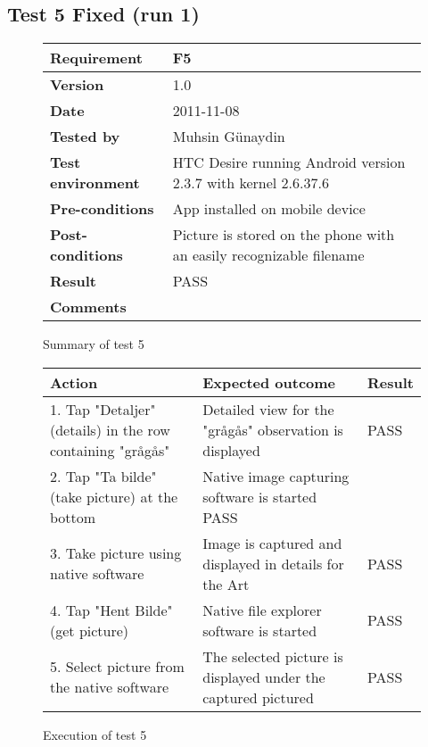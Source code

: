 

\newpage
\subsection{Test 5 Fixed (run 1)}

	\begin{figure}[htb]
		\centering
		\begin{tabular}{|p{3.5cm}|p{7.0cm}|} \hline
			\textbf{Requirement} & F5 \\ \hline
			\textbf{Version} & 1.0 \\ \hline
			\textbf{Date} & 2011-11-08 \\ \hline
			\textbf{Tested by} & Muhsin Günaydin \\ \hline
			\textbf{Test environment} & HTC Desire running Android version 2.3.7 with kernel 2.6.37.6 \\ \hline
			\textbf{Pre-conditions} & App installed on mobile device \\ \hline
			\textbf{Post-conditions} & Picture is stored on the phone with an easily recognizable filename \\ \hline
			\textbf{Result} & PASS \\ \hline
			\textbf{Comments} & \\ \hline
		\end{tabular}
		\caption{Summary of test 5}
	\end{figure}

	\begin{figure}[htb]
		\centering
		\begin{tabular}{|p{5.0cm}|p{5.0cm}|p{1cm}|}
			\hline \textbf{Action} & \textbf{Expected outcome} & \textbf{Result} \\ \hline
			1. Tap "Detaljer" (details) in the row containing "grågås"  &
			Detailed view for the "grågås" observation is displayed & 
			PASS \\ \hline

			2. Tap "Ta bilde" (take picture) at the bottom &
			Native image capturing software is started
			PASS\\ \hline

			3. Take picture using native software &
			Image is captured and displayed in details for the Art &
			PASS\\ \hline
			
			4. Tap "Hent Bilde" (get picture) &
			Native file explorer software is started &
			PASS\\ \hline

			5. Select picture from the native software &
			The selected picture is displayed under the captured pictured &
			PASS\\ \hline
		
		\end{tabular}
		\caption{Execution of test 5}
	\end{figure}


\newpage
